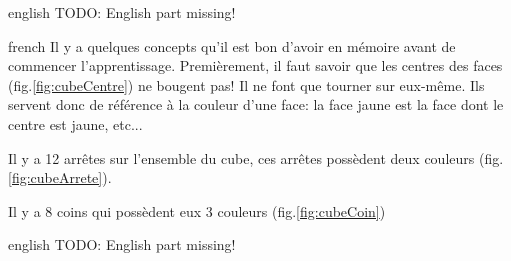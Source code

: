 \documentclass[0_Main.tex]{subfiles}
\begin{document}
\begin{shownto}{english}
TODO: English part missing! 
\end{shownto}

\clearpage
{}
\begin{shownto}{french}
Il y a quelques concepts qu’il est bon d’avoir en mémoire avant de commencer l’apprentissage. Premièrement, il faut savoir que les centres des faces (fig.\ref{fig:cubeCentre}) ne bougent pas! Il ne font que tourner sur eux-même. Ils servent donc de référence à la couleur d’une face: la face jaune est la face dont le centre est jaune, etc... 

Il y a 12 arrêtes sur l’ensemble du cube, ces arrêtes possèdent deux couleurs (fig.\ref{fig:cubeArrete}).

Il y a 8 coins qui possèdent eux 3 couleurs (fig.\ref{fig:cubeCoin})
\end{shownto}

\begin{shownto}{english}
TODO: English part missing! 
\end{shownto}
\end{document}
